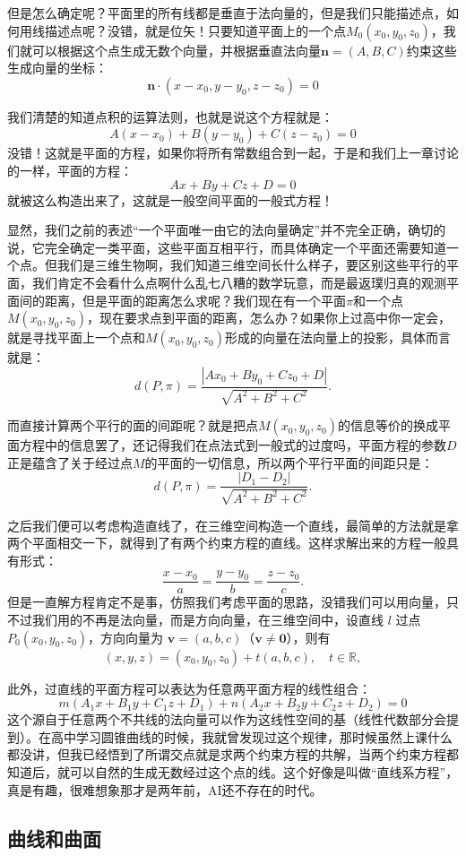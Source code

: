 \documentclass[UTF8]{ctexbook}
\newcommand{\R}{\mathbb{R}}
\begin{document}
但是怎么确定呢？平面里的所有线都是垂直于法向量的，但是我们只能描述点，如何用线描述点呢？没错，就是位矢！只要知道平面上的一个点$M_0(x_0,y_0,z_0)$，我们就可以根据这个点生成无数个向量，并根据垂直法向量$\mathbf{n}=(A,B,C)$约束这些生成向量的坐标：
\[
 \mathbf{n} \cdot (x-x_0,y-y_0,z-z_0) =0
\]

我们清楚的知道点积的运算法则，也就是说这个方程就是：
\[
  A(x-x_0)+B(y-y_0)+C(z-z_0)=0
\]
没错！这就是平面的方程，如果你将所有常数组合到一起，于是和我们上一章讨论的一样，平面的方程：
\[
  Ax+By+Cz+D=0
\]
就被这么构造出来了，这就是一般空间平面的一般式方程！

显然，我们之前的表述“一个平面唯一由它的法向量确定”并不完全正确，确切的说，它完全确定一类平面，这些平面互相平行，而具体确定一个平面还需要知道一个点。但我们是三维生物啊，我们知道三维空间长什么样子，要区别这些平行的平面，我们肯定不会看什么点啊什么乱七八糟的数学玩意，而是最返璞归真的观测平面间的距离，但是平面的距离怎么求呢？我们现在有一个平面$\pi$和一个点$M(x_0,y_0,z_0)$，现在要求点到平面的距离，怎么办？如果你上过高中你一定会，就是寻找平面上一个点和$M(x_0,y_0,z_0)$形成的向量在法向量上的投影，具体而言就是：
\[
 d(P,\pi)=\frac{|Ax_0+By_0+Cz_0+D|}{\sqrt{A^2+B^2+C^2}}.
\]

而直接计算两个平行的面的间距呢？就是把点$M(x_0,y_0,z_0)$的信息等价的换成平面方程中的信息罢了，还记得我们在点法式到一般式的过度吗，平面方程的参数$D$正是蕴含了关于经过点$M$的平面的一切信息，所以两个平行平面的间距只是：
\[
 d(P,\pi)=\frac{|D_1-D_2|}{\sqrt{A^2+B^2+C^2}}.
\]

之后我们便可以考虑构造直线了，在三维空间构造一个直线，最简单的方法就是拿两个平面相交一下，就得到了有两个约束方程的直线。这样求解出来的方程一般具有形式：
\[
  \frac{x-x_0}{a}=\frac{y-y_0}{b}=\frac{z-z_0}{c}.
\]
但是一直解方程肯定不是事，仿照我们考虑平面的思路，没错我们可以用向量，只不过我们用的不再是法向量，而是方向向量，在三维空间中，设直线 $l$ 过点 $P_0(x_0,y_0,z_0)$，方向向量为
$\mathbf{v}=(a,b,c)$（$\mathbf{v}\neq\mathbf{0}$），则有
\[
  (x,y,z)=(x_0,y_0,z_0)+t(a,b,c),\quad t\in\R,
\]

此外，过直线的平面方程可以表达为任意两平面方程的线性组合：
\[
  m(A_1x+B_1y+C_1z+D_1)+n(A_2x+B_2y+C_2z+D_2)=0
\]
这个源自于任意两个不共线的法向量可以作为这线性空间的基（线性代数部分会提到）。在高中学习圆锥曲线的时候，我就曾发现过这个规律，那时候虽然上课什么都没讲，但我已经悟到了所谓交点就是求两个约束方程的共解，当两个约束方程都知道后，就可以自然的生成无数经过这个点的线。这个好像是叫做“直线系方程”，真是有趣，很难想象那才是两年前，AI还不存在的时代。

\subsection{曲线和曲面}
\end{document}

